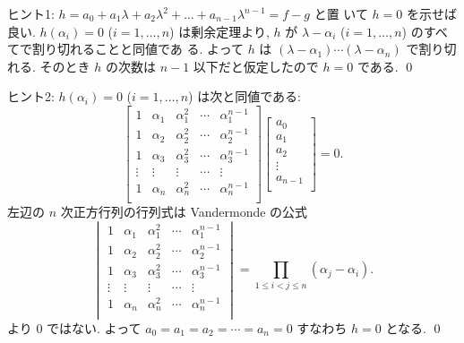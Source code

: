 \documentclass[12pt,twoside]{jarticle}
\begin{document}
\noindent
ヒント1: $h=a_0+a_1\lambda+a_2\lambda^2+\dots+a_{n-1}\lambda^{n-1}=f-g$ と置
いて $h=0$ を示せば良い.  $h(\alpha_i)=0$ ($i=1,\dots,n$) は剰余定理より, 
$h$ が $\lambda-\alpha_i$ ($i=1,\dots,n$) のすべてで割り切れることと同値であ
る.  よって $h$ は $(\lambda-\alpha_1)\cdots(\lambda-\alpha_n)$ で割り切れる.
そのとき $h$ の次数は $n-1$ 以下だと仮定したので $h=0$ である.
\qed

\medskip
\noindent
ヒント2: $h(\alpha_i)=0$ ($i=1,\dots,n$) は次と同値である:
\begin{equation*}
  \begin{bmatrix}
    1      & \alpha_1 & \alpha_1^2 & \cdots & \alpha_1^{n-1} \\
    1      & \alpha_2 & \alpha_2^2 & \cdots & \alpha_2^{n-1} \\
    1      & \alpha_3 & \alpha_3^2 & \cdots & \alpha_3^{n-1} \\
    \vdots & \vdots   & \vdots     & \cdots & \vdots         \\
    1      & \alpha_n & \alpha_n^2 & \cdots & \alpha_n^{n-1} \\
  \end{bmatrix}
  \begin{bmatrix}
    a_0 \\ a_1 \\ a_2 \\ \vdots \\ a_{n-1} \\
  \end{bmatrix}
  = 0.
\end{equation*}
左辺の $n$ 次正方行列の行列式は Vandermonde の公式
\begin{equation*}
  \begin{vmatrix}
    1      & \alpha_1 & \alpha_1^2 & \cdots & \alpha_1^{n-1} \\
    1      & \alpha_2 & \alpha_2^2 & \cdots & \alpha_2^{n-1} \\
    1      & \alpha_3 & \alpha_3^2 & \cdots & \alpha_3^{n-1} \\
    \vdots & \vdots   & \vdots     & \cdots & \vdots         \\
    1      & \alpha_n & \alpha_n^2 & \cdots & \alpha_n^{n-1} \\
  \end{vmatrix}
  =
  \prod_{1\le i < j \le n} (\alpha_j - \alpha_i).
\end{equation*}
より $0$ ではない.
よって $a_0=a_1=a_2=\cdots=a_n=0$ すなわち $h=0$ となる.
\qed

\end{document}
